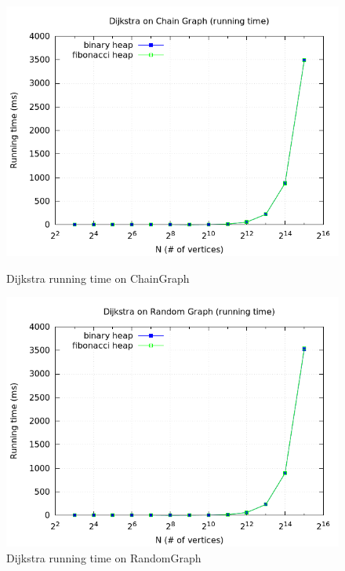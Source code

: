\documentclass[a4paper,oneside,article,11pt]{memoir}
\begin{document}
\begin{figure}[H]
\centering
\begin{minipage}{0.48\columnwidth}
  \centering
  \includegraphics[width=\linewidth]{../res/dijkstra/d_chain_rt.png}%
  \caption{Dijkstra running time on ChainGraph}
  \label{fig:dijkstra_chain_rt}
\end{minipage}%
\hfill
\begin{minipage}{0.48\columnwidth}
  \centering
  \includegraphics[width=\linewidth]{../res/dijkstra/d_random_rt.png}%
  \caption{Dijkstra running time on RandomGraph}
  \label{fig:dijkstra_random_rt}
\end{minipage}
\end{figure}
\end{document}

